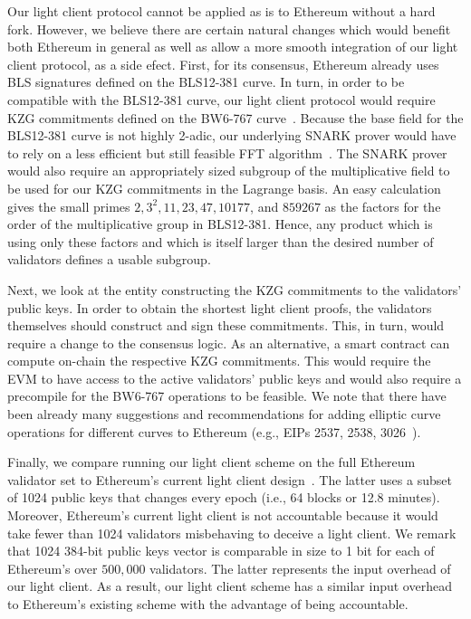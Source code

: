 Our light client protocol cannot be applied as is to Ethereum without a hard fork. However, we believe there are certain natural changes which would benefit both Ethereum in general  
as well as allow a more smooth integration of our light client protocol, as a side efect. First, for its consensus, Ethereum already uses BLS signatures defined on the BLS12-381 curve. In turn, in order to be compatible 
with the BLS12-381 curve, our light client protocol would require KZG commitments defined on the BW6-767 curve~\cite{bw6767}. Because the base field for the BLS12-381 curve is not highly 2-adic, 
our underlying SNARK prover would have to rely on a less efficient but still feasible FFT algorithm~\cite{bw6767}. The SNARK prover would also require 
an appropriately sized subgroup of the multiplicative field to be used for our KZG commitments in the Lagrange basis. An easy calculation gives the small primes $2, 3^2, 11, 23, 47, 10177$, and $859267$ 
as the factors for the order of the multiplicative group in BLS12-381. Hence, any product which is using only these factors and which is itself larger than the desired number of validators defines a usable subgroup.
 
Next, we look at the entity constructing the KZG commitments to the validators' public keys. In order to obtain the shortest light client proofs, the validators themselves should construct and sign these commitments. 
This, in turn, would require a change to the consensus logic. As an alternative, a smart contract can compute on-chain the respective KZG commitments.
This would require the EVM to have access to the active validators' public keys and would also require a precompile for the BW6-767 operations to be feasible.
We note that there have been already many suggestions and recommendations for adding elliptic curve operations for different curves to Ethereum (e.g., EIPs 2537, 2538, 3026~\cite{EIPs}). 
 
Finally, we compare running our light client scheme on the full Ethereum validator set to Ethereum's current light client design~\cite{ethlight}.
The latter uses a subset of 1024 public keys that changes every epoch (i.e., 64 blocks or 12.8 minutes). Moreover, Ethereum's current light client is not accountable because it would take fewer than 
1024 validators misbehaving to deceive a light client. We remark that 1024 384-bit public keys vector is comparable in size to 1 bit for each of Ethereum's over $500,000$ validators. 
The latter represents the input overhead of our light client. As a result, our light client scheme has a similar input overhead to Ethereum's existing scheme with the advantage of being accountable.

